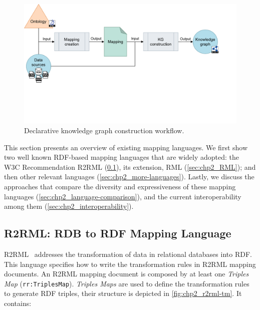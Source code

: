 \begin{figure}[h]
\centering
\includegraphics[width=0.9\linewidth]{figures/chp2_kgc-workflow.pdf}
\caption[Declarative knowledge graph construction workflow]{Declarative knowledge graph construction workflow.}
\label{fig:chp2_kgc-workflow}
\end{figure}

This section presents an overview of existing mapping languages. We first show two well known RDF-based mapping languages that are widely adopted: the W3C Recommendation R2RML (\cref{sec:chp2_R2RML}), its extension, RML (\cref{sec:chp2_RML}); and then other relevant languages (\cref{sec:chp2_more-languages}). Lastly, we discuss the approaches that compare the diversity and expressiveness of these mapping languages (\cref{sec:chp2_language-comparison}), and the current interoperability among them (\cref{sec:chp2_interoperability}).






\subsection{R2RML: RDB to RDF Mapping Language}
\label{sec:chp2_R2RML}

R2RML~\parencite{das2012r2rml} addresses the transformation of data in relational databases into RDF. This language specifies how to write the transformation rules in R2RML mapping documents. An R2RML mapping document is composed by at least one \textit{Triples Map} (\texttt{rr:TriplesMap}). \textit{Triples Maps} are used to define the transformation rules to generate RDF triples, their structure is depicted in \cref{fig:chp2_r2rml-tm}. It contains:

